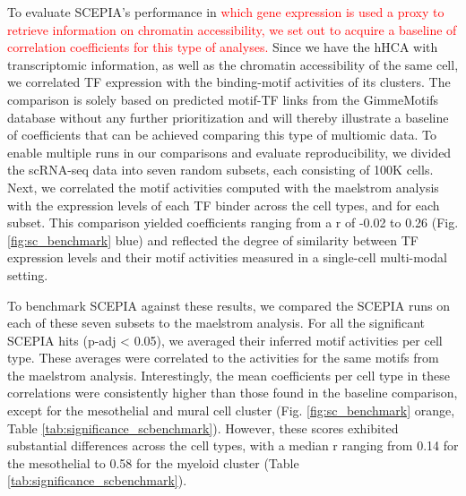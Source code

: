 To evaluate SCEPIA's performance in \textcolor{red}{which gene expression is used a proxy to retrieve information on chromatin accessibility, we set out to acquire a baseline of correlation coefficients for this type of analyses.} Since we have the hHCA with transcriptomic information, as well as the chromatin accessibility of the same cell, we correlated TF expression with the binding-motif activities of its clusters. The comparison is solely based on predicted motif-TF links from the GimmeMotifs database without any further prioritization and will thereby illustrate a baseline of coefficients that can be achieved comparing this type of multiomic data. To enable multiple runs in our comparisons and evaluate reproducibility, we divided the scRNA-seq data into seven random subsets, each consisting of 100K cells. Next, we correlated the motif activities computed with the maelstrom analysis with the expression levels of each TF binder across the cell types, and for each subset. This comparison yielded coefficients ranging from a r of -0.02 to 0.26 (Fig. \ref{fig:sc_benchmark} blue) and reflected the degree of similarity between TF expression levels and their motif activities measured in a single-cell multi-modal setting.

To benchmark SCEPIA against these results, we compared the SCEPIA runs on each of these seven subsets to the maelstrom analysis. For all the significant SCEPIA hits (p-adj < 0.05), we averaged their inferred motif activities per cell type. These averages were correlated to the activities for the same motifs from the maelstrom analysis. Interestingly, the mean coefficients per cell type in these correlations were consistently higher than those found in the baseline comparison, except for the mesothelial and mural cell cluster (Fig. \ref{fig:sc_benchmark} orange, Table \ref{tab:significance_scbenchmark}). However, these scores exhibited substantial differences across the cell types, with a median r ranging from 0.14 for the mesothelial to 0.58 for the myeloid cluster (Table \ref{tab:significance_scbenchmark}).

